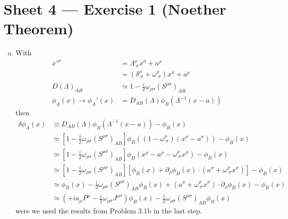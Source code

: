 \documentclass[10pt,a4paper]{report}
\theoremstyle{definition}
\begin{document}
\section{Sheet 4 — Exercise 1 (Noether Theorem)}

\begin{enumerate}[a)]
\item With
\begin{align}
x'^{\rho}
&=\Lambda^\rho_{\;\sigma} x^\sigma+a^\rho\\
&=(\delta^\rho_{\;\sigma}+\omega^\rho_{\;\sigma}) x^\sigma+a^\rho\\
D(\Lambda)_{AB}
&\simeq 1-\frac{i}{2}\omega_{\rho\sigma}(S^{\rho\sigma})_{AB}\\
\phi_A(x)\rightarrow\phi_A'(x)&=D_{AB}(\Lambda)\phi_B(\Lambda^{-1}(x-a))
\end{align}
then
\begin{align}
\delta\phi_A(x)
&\equiv D_{AB}(\Lambda)\phi_B(\Lambda^{-1}(x-a))-\phi_B(x)\\
&\simeq \left[1-\frac{i}{2}\omega_{\rho\sigma}(S^{\rho\sigma})_{AB}\right]\phi_B\left((1-\omega^\rho_{\;\sigma})(x^\sigma-a^\sigma)\right)-\phi_B(x)\\
&\simeq \left[1-\frac{i}{2}\omega_{\rho\sigma}(S^{\rho\sigma})_{AB}\right]\phi_B\left(x^\rho-a^\rho -\omega^\rho_{\;\sigma}x^\sigma\right)-\phi_B(x)\\
&\simeq \left[1-\frac{i}{2}\omega_{\rho\sigma}(S^{\rho\sigma})_{AB}\right]\left[\phi_B(x)+\partial_\rho\phi_B(x)\cdot\left(a^\sigma +\omega^\rho_{\;\sigma}x^\sigma\right)\right]-\phi_B(x)\\
&\simeq \phi_B(x)-\frac{i}{2}\omega_{\rho\sigma}(S^{\rho\sigma})_{AB}\phi_B(x)+\left(a^\sigma +\omega^\rho_{\;\sigma}x^\sigma\right)\cdot\partial_\rho\phi_B(x)-\phi_B(x)\\
&\simeq \left(+ia_\mu P^\mu -\frac{i}{2}\omega_{\rho\sigma}J^{\rho\sigma}\right)\phi_B(x)-\frac{i}{2}\omega_{\rho\sigma}(S^{\rho\sigma})_{AB}\phi_B(x)
\end{align}
were we used the results from Problem 3.1b in the last step.


\end{enumerate}
\end{document}
